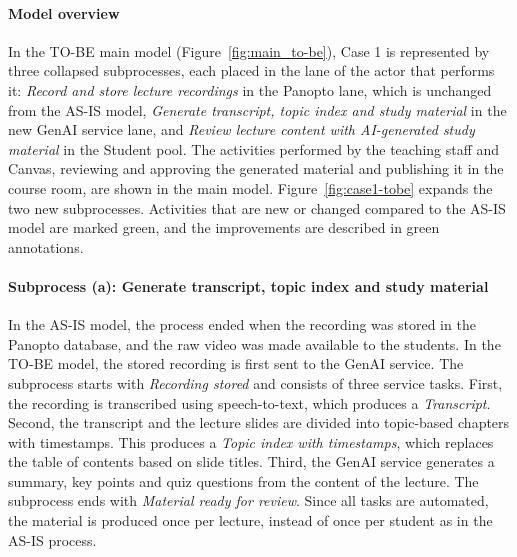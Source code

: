 \paragraph{Model overview}
In the TO-BE main model (Figure~\ref{fig:main_to-be}), Case 1 is represented by three collapsed subprocesses, each placed in the lane of the actor that performs it: \textit{Record and store lecture recordings} in the Panopto lane, which is unchanged from the AS-IS model, \textit{Generate transcript, topic index and study material} in the new GenAI service lane, and \textit{Review lecture content with AI-generated study material} in the Student pool. The activities performed by the teaching staff and Canvas, reviewing and approving the generated material and publishing it in the course room, are shown in the main model. Figure~\ref{fig:case1-tobe} expands the two new subprocesses. Activities that are new or changed compared to the AS-IS model are marked green, and the improvements are described in green annotations.

\paragraph{Subprocess (a): Generate transcript, topic index and study material}
In the AS-IS model, the process ended when the recording was stored in the Panopto database, and the raw video was made available to the students. In the TO-BE model, the stored recording is first sent to the GenAI service. The subprocess starts with \textit{Recording stored} and consists of three service tasks. First, the recording is transcribed using speech-to-text, which produces a \textit{Transcript}. Second, the transcript and the lecture slides are divided into topic-based chapters with timestamps. This produces a \textit{Topic index with timestamps}, which replaces the table of contents based on slide titles. Third, the GenAI service generates a summary, key points and quiz questions from the content of the lecture. The subprocess ends with \textit{Material ready for review}. Since all tasks are automated, the material is produced once per lecture, instead of once per student as in the AS-IS process. %

